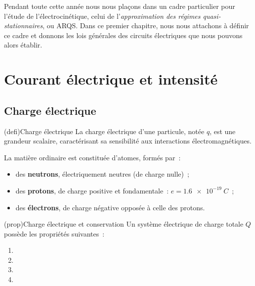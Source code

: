\documentclass[../../main/main.tex]{subfiles}
\begin{document}
\vspace*{\fill}

Pendant toute cette année nous nous plaçons dans un cadre particulier pour
l'étude de l'électrocinétique, celui de l'\textit{approximation des régimes
	quasi-stationnaires}, ou ARQS. Dans ce premier chapitre, nous nous attachons à
définir ce cadre et donnons les lois générales des circuits électriques que nous
pouvons alors établir.

\vspace*{\fill}

\newpage

\section{Courant électrique et intensité}
\subsection{Charge électrique}

\begin{tcb}[label=def:q, sidebyside](defi){Charge électrique}
	La charge électrique d'une particule, notée $q$, est une grandeur
	scalaire, caractérisant sa sensibilité aux interactions
	électromagnétiques.
	\tcblower
\end{tcb}
La matière ordinaire est constituée d'atomes, formés par~:
\begin{itemize}
	\item
	      des \textbf{neutrons}, électriquement neutres (de charge nulle)~;
	\item
	      des \textbf{protons}, de charge positive et fondamentale~: $e =
		      \SI{1.6e-19}{C}$~;
	\item
	      des \textbf{électrons}, de charge négative opposée à celle des
	      protons.
\end{itemize}
\begin{tcb*}[label=prop:q](prop){Charge électrique et conservation}
	Un système électrique de charge totale $Q$ possède les propriétés
	suivantes~:
	\begin{enumerate}
		\item {}%
		\item {}%
		\item {}%
		\item {}%
	\end{enumerate}
\end{tcb*}
\end{document}
